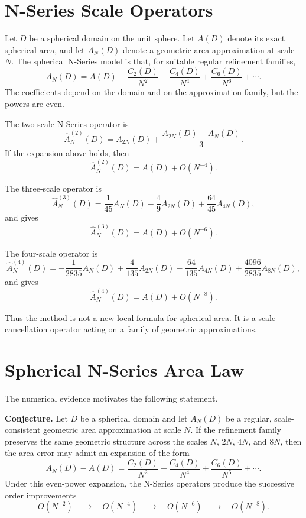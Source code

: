 \documentclass[11pt]{article}
\begin{document}
\section{N-Series Scale Operators}

Let $D$ be a spherical domain on the unit sphere.  Let $A(D)$ denote its
exact spherical area, and let $A_N(D)$ denote a geometric area approximation
at scale $N$.  The spherical N-Series model is that, for suitable regular
refinement families,
\[
  A_N(D)
  =
  A(D)
  +
  \frac{C_2(D)}{N^2}
  +
  \frac{C_4(D)}{N^4}
  +
  \frac{C_6(D)}{N^6}
  +
  \cdots .
\]
The coefficients depend on the domain and on the approximation family, but
the powers are even.

The two-scale N-Series operator is
\[
  \widehat{A}^{(2)}_N(D)
  =
  A_{2N}(D)
  +
  \frac{A_{2N}(D)-A_N(D)}{3}.
\]
If the expansion above holds, then
\[
  \widehat{A}^{(2)}_N(D)
  =
  A(D)+O(N^{-4}).
\]

The three-scale operator is
\[
  \widehat{A}^{(3)}_N(D)
  =
  \frac{1}{45}A_N(D)
  -
  \frac{4}{9}A_{2N}(D)
  +
  \frac{64}{45}A_{4N}(D),
\]
and gives
\[
  \widehat{A}^{(3)}_N(D)
  =
  A(D)+O(N^{-6}).
\]

The four-scale operator is
\[
  \widehat{A}^{(4)}_N(D)
  =
  -\frac{1}{2835}A_N(D)
  +
  \frac{4}{135}A_{2N}(D)
  -
  \frac{64}{135}A_{4N}(D)
  +
  \frac{4096}{2835}A_{8N}(D),
\]
and gives
\[
  \widehat{A}^{(4)}_N(D)
  =
  A(D)+O(N^{-8}).
\]

Thus the method is not a new local formula for spherical area.  It is a
scale-cancellation operator acting on a family of geometric approximations.

\section{Spherical N-Series Area Law}

The numerical evidence motivates the following statement.

\medskip

\noindent
\textbf{Conjecture.}
Let $D$ be a spherical domain and let $A_N(D)$ be a regular,
scale-consistent geometric area approximation at scale $N$.  If the
refinement family preserves the same geometric structure across the scales
$N$, $2N$, $4N$, and $8N$, then the area error may admit an expansion of the
form
\[
  A_N(D)-A(D)
  =
  \frac{C_2(D)}{N^2}
  +
  \frac{C_4(D)}{N^4}
  +
  \frac{C_6(D)}{N^6}
  +
  \cdots .
\]
Under this even-power expansion, the N-Series operators produce the
successive order improvements
\[
  O(N^{-2})
  \quad\longrightarrow\quad
  O(N^{-4})
  \quad\longrightarrow\quad
  O(N^{-6})
  \quad\longrightarrow\quad
  O(N^{-8}).
\]
\end{document}
